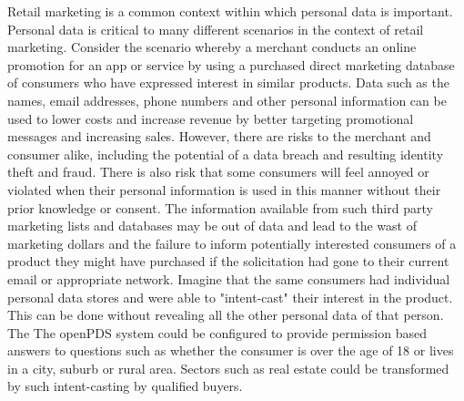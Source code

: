 Retail marketing is a common context within which personal data is important.  Personal data is critical to many different scenarios in the context of retail marketing.  Consider the scenario whereby a merchant conducts an online promotion for an app or service by using a purchased direct marketing database of consumers who have expressed interest in similar products.  Data such as the names, email addresses, phone numbers and other personal information can be used to lower costs and increase revenue by better targeting promotional messages and increasing sales.  However, there are risks to the merchant and consumer alike, including the potential of a data breach and resulting identity theft and fraud.  There is also risk that some consumers will feel annoyed or violated when their personal information is used in this manner without their prior knowledge or consent. The information available from such third party marketing lists and databases may be out of data and lead to the wast of marketing dollars and the failure to inform potentially interested consumers of a product they might have purchased if the solicitation had gone to their current email or appropriate network.  Imagine that the same consumers had individual personal data stores and were able to "intent-cast" their interest in the product. This can be done without revealing all the other personal data of that person. The  The openPDS system could be configured to provide permission based answers to questions such as whether the consumer is over the age of 18 or lives in a city, suburb or rural area.  Sectors such as real estate could be transformed by such intent-casting by qualified buyers.   

